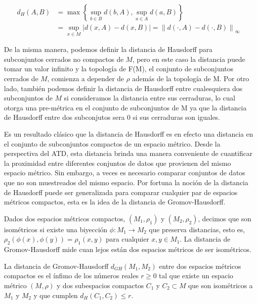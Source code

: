 \begin{align*}
    d_{H}\left(A, B\right) & = \max\left\{\sup_{b\in B}d\left(b, A\right),
    \sup_{a\in A}d\left(a, B\right)\right\} \\
    & = \sup_{x\in M}\left|d\left(x, A\right) - d\left(x, B\right)\right| =
    \left\|d\left(\cdot, A\right) - d\left(\cdot, B\right)\right\|_{\infty}
\end{align*}

De la misma manera, podemos definir la distancia de Hausdorff
para subconjuntos cerrados no compactos de $M$,
pero en este caso la distancia puede tomar un valor infinito y la topolog\'ia de F(M),
el conjunto de subconjuntos cerrados de $M$,
comienza a depender de $\rho$ adem\'as de la topolog\'ia de M.
Por otro lado, tambi\'en podemos definir la distancia de Hausdorff entre
cualesquiera dos subconjuntos de $M$ si consideramos la distancia entre sus cerraduras,
lo cual otorga una pre-m\'etrica en el conjunto de subconjuntos de M
ya que la distancia de Hausdorff entre dos subconjutos sera $0$ si sus cerraduras son iguales.

Es un resultado cl\'asico que la distancia de Hausdorff es en efecto una distancia en el conjunto de
subconjuntos compactos de un espacio m\'etrico. Desde la perspectiva del ATD, esta distancia
brinda una manera conveniente de cuantificar la proximidad entre diferentes conjuntos de datos que
provienen del mismo espacio m\'etrico. Sin embargo, a veces es necesario comparar conjuntos de datos que
no son muestreados del mismo espacio. Por fortuna la noci\'on de la distancia de Hausdorff puede ser
generalizada para comparar cualquier par de espacios m\'etricos compactos, esta es la idea de la distancia
de Gromov-Hausdorff.

Dados dos espacios m\'etricos compactos, $\left(M_{1}, \rho_{1}\right)$ y $\left(M_{2}, \rho_{2}\right)$,
decimos que son isom\'etricos si existe una biyecci\'on $\phi: M_{1}\rightarrow M_{2}$ que preserva
distancias, esto es, $\rho_{2}\left(\phi\left(x\right), \phi\left(y\right)\right) =
\rho_{1}\left(x, y\right)$ para cualquier $x, y \in M_{1}$. La distancia de Gromov-Hausdorff mide cuan lejos
est\'an dos espacios m\'etricos de ser isom\'etricos.

\begin{definicion}
    La distancia de Gromov-Hausdorff $d_{GH}\left(M_{1}, M_{2}\right)$ entre dos espacios m\'etricos
    compactos es el \'infimo de los n\'umeros reales $r \geq 0$ tal que existe un espacio m\'etrico
    $\left(M, \rho\right)$ y dos subespacios compactos $C_{1}$ y $C_{2} \subset M$ que son isom\'etricos
    a $M_{1}$ y $M_{2}$ y que cumplen $d_{H}\left(C_{1}, C_{2}\right) \leq r$.
\end{definicion}

